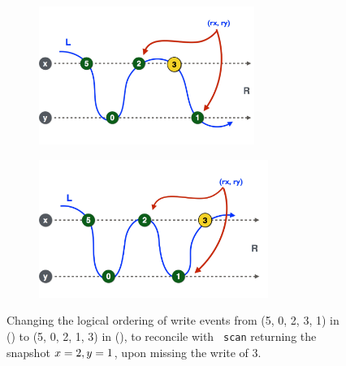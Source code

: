 \begin{figure}[t]
\begin{subfigure}[t]{0.48\textwidth}
\includegraphics[height=4.5cm]{res/before-logical-trans.pdf}
\caption{\label{fig:reorder:before}} %
\end{subfigure} \hfill
\begin{subfigure}[t]{0.48\textwidth}
\includegraphics[height=4.5cm]{res/after-logical-trans.pdf}
\caption{\label{fig:reorder:after}} %
\end{subfigure}%
%
\caption{\label{fig:reorder} Changing the logical ordering of write
  events from (5, 0, 2, 3, 1) in () to (5,
  0, 2, 1, 3) in (), to reconcile with {\tt
    scan} returning the snapshot $x=2, y=1$, upon missing the write
  of $3$.}
\end{figure}

